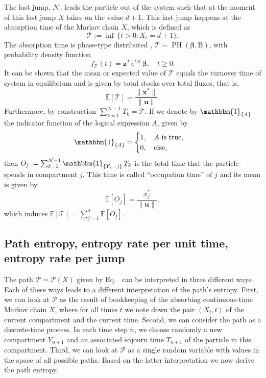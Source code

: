 \documentclass[smallextended]{svjour3}
\makeatletter
\renewcommand*{\eqref}[1]{%
  \hyperref[{#1}]{\textup{\tagform@{\ref*{#1}}}}%
}
\renewcommand{\tens}[1]{\mathrm{#1}}
\renewcommand{\vec}[1]{\mathbf{#1}}
\newcommand{\E}{\mathbb{E}}
\newcommand{\TT}{\mathcal{T}}
\newcommand{\PH}{\operatorname{PH}}
\newcommand{\vnorms}[1]{\|#1\|}
\newcommand{\ie}{that is}
\newcommand{\pdf}{probability density function}
\renewcommand{\emph}[1]{``#1''}
\makeatother
\begin{document}
The last jump, $\mathcal{N}$, leads the particle out of the system such that at the moment of this last jump $X$ takes on the value $d+1$.
This last jump happens at the absorption time of the Markov chain $X$, which is defined as
\begin{equation}
   \TT := \inf\,\{t>0: X_t=d+1\}.
\end{equation}
The absorption time is phase-type distributed \citep{Neuts1981}, $\TT\sim\PH(\vec{\beta},\tens{B})$, with \pdf
\begin{equation}
  f_{\TT}(t) = \vec{z}^T\,e^{t\,\tens{B}}\,\vec{\beta},\quad t\geq0.
\end{equation}
It can be shown \citep[Sect.~3.2]{Metzler2018MGS} that the mean or expected value of $\TT$ equals the turnover time \citep{Sierra2016GlobChangBiol} of system \eqref{eqn:lin_CS_sys} in equilibrium and is given by total stocks over total fluxes, \ie, 
\begin{equation}
  \E\left[\TT\right] = \frac{\vnorms{\vec{x}^\ast}}{\vnorms{\vec{u}}}.
\end{equation}
Furthermore, by construction $\sum_{k=1}^{\mathcal{N}-1} T_k = \TT$.
If we denote by $\mathbbm{1}_{\{A\}}$ the indicator function of the logical expression $A$, given by
\begin{equation}
  \mathbbm{1}_{\{A\}} =
  \begin{cases}
    1, \quad A\text{ is true},\\
    0, \quad\text{else},
  \end{cases}
\end{equation}
then $O_j:=\sum_{k=1}^{\mathcal{N}-1} \mathbbm{1}_{\{Y_k=j\}}\,T_k$ is the total time that the particle spends in compartment $j$.
This time is called \emph{occupation time} of $j$ and its mean is given by \citep[Sect.~3.3]{Metzler2018MGS}
\begin{equation}
  \label{eqn:occupation_time}
  \E\left[O_j\right] = \frac{x^\ast_j}{\vnorms{\vec{u}}},
\end{equation}
which induces $\E\left[\TT\right] = \sum_{j=1}^d \E\left[O_j\right]$.


\subsection{Path entropy, entropy rate per unit time, entropy rate per jump}
\label{sec:path_entropy}
The path $\mathcal{P}=\mathcal{P}(X)$ given by Eq.~\eqref{eqn:path} can be interpreted in three different ways.
Each of these ways leads to a different interpretation of the path's entropy.
First, we can look at $\mathcal{P}$ as the result of bookkeeping of the absorbing continuous-time Markov chain $X$, where for all times $t$ we note down the pair $(X_t,t)$ of the current compartment and the current time.
Second, we can consider the path as a discrete-time process.
In each time step $n$, we choose randomly a new compartment $Y_{n+1}$ and an associated sojourn time $T_{n+1}$ of the particle in this compartment.
Third, we can look at $\mathcal{P}$ as a single random variable with values in the space of all possible paths.
Based on the latter interpretation we now derive the path entropy.
\end{document}
